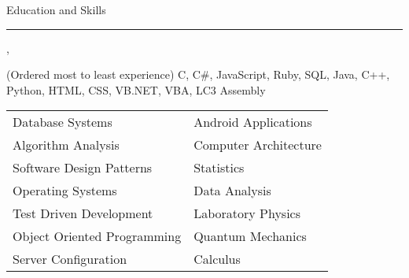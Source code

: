 \documentclass[10pt]{article}
\newcommand{\simsbullet}{{\raisebox{2pt}{\tiny $\bullet$}}\hspace{8pt}}
\begin{document}
\setlength{\leftskip}{0pt}

\vskip 16pt

{\Large\sffamily Education and Skills}
\vskip 4pt
\hrule
\vskip 6pt
{}
\vskip 2pt
\hspace*{12pt} {\itshape{}}, {} \\
\hspace*{12pt} {\itshape{}}


\vskip 6pt
{ (Ordered most to least experience)}
\vskip 2pt
\hspace*{12pt} {\sffamily C, C\#, JavaScript, Ruby, SQL, Java, C++, Python, HTML, CSS, VB.NET, VBA, LC3 Assembly}

\vskip 8pt

{}

\vskip 4pt

\setlength{\leftskip}{16pt}


  \begin{tabular}{ l@{\hskip 2.2in} l }

    \simsbullet Database Systems & \simsbullet Android Applications \\
    \simsbullet Algorithm Analysis & \simsbullet Computer Architecture \\
    \simsbullet Software Design Patterns & \simsbullet Statistics \\
    \simsbullet Operating Systems & \simsbullet Data Analysis\\
    \simsbullet Test Driven Development & \simsbullet Laboratory Physics \\
    \simsbullet Object Oriented Programming & \simsbullet Quantum Mechanics \\
    \simsbullet Server Configuration & \simsbullet Calculus  \\

  \end{tabular}


\setlength{\leftskip}{0pt}



\end{document}
